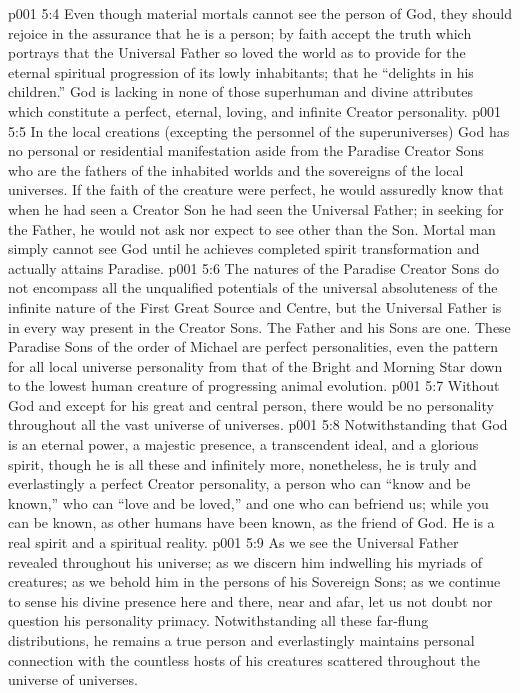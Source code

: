 \vs p001 5:4 Even though material mortals cannot see the person of God, they should rejoice in the assurance that he is a person; by faith accept the truth which portrays that the Universal Father so loved the world as to provide for the eternal spiritual progression of its lowly inhabitants; that he “delights in his children.” God is lacking in none of those superhuman and divine attributes which constitute a perfect, eternal, loving, and infinite Creator personality.
\vs p001 5:5 \pc In the local creations (excepting the personnel of the superuniverses) God has no personal or residential manifestation aside from the Paradise Creator Sons who are the fathers of the inhabited worlds and the sovereigns of the local universes. If the faith of the creature were perfect, he would assuredly know that when he had seen a Creator Son he had seen the Universal Father; in seeking for the Father, he would not ask nor expect to see other than the Son. Mortal man simply cannot see God until he achieves completed spirit transformation and actually attains Paradise.
\vs p001 5:6 The natures of the Paradise Creator Sons do not encompass all the unqualified potentials of the universal absoluteness of the infinite nature of the First Great Source and Centre, but the Universal Father is in every way  present in the Creator Sons. The Father and his Sons are one. These Paradise Sons of the order of Michael are perfect personalities, even the pattern for all local universe personality from that of the Bright and Morning Star down to the lowest human creature of progressing animal evolution.
\vs p001 5:7 \pc Without God and except for his great and central person, there would be no personality throughout all the vast universe of universes. 
\vs p001 5:8 \pc Notwithstanding that God is an eternal power, a majestic presence, a transcendent ideal, and a glorious spirit, though he is all these and infinitely more, nonetheless, he is truly and everlastingly a perfect Creator personality, a person who can “know and be known,” who can “love and be loved,” and one who can befriend us; while you can be known, as other humans have been known, as the friend of God. He is a real spirit and a spiritual reality.
\vs p001 5:9 As we see the Universal Father revealed throughout his universe; as we discern him indwelling his myriads of creatures; as we behold him in the persons of his Sovereign Sons; as we continue to sense his divine presence here and there, near and afar, let us not doubt nor question his personality primacy. Notwithstanding all these far\hyp{}flung distributions, he remains a true person and everlastingly maintains personal connection with the countless hosts of his creatures scattered throughout the universe of universes.
